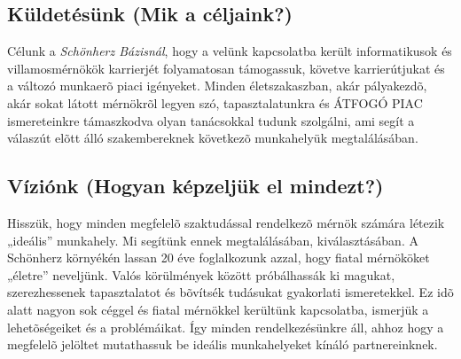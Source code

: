 \documentclass[12pt,a4paper]{report}	%
\begin{document}
\subsection{Küldetésünk (Mik a céljaink?)}
Célunk a \emph{Schönherz Bázisnál}, hogy a velünk kapcsolatba került informatikusok és villamosmérnökök karrierjét folyamatosan támogassuk, követve karrierútjukat és a változó munkaerõ piaci igényeket. Minden életszakaszban, akár pályakezdõ, akár sokat látott mérnökrõl legyen szó, tapasztalatunkra és \MakeUppercase{átfogó piac} ismereteinkre támaszkodva olyan tanácsokkal tudunk szolgálni, ami segít a válaszút elõtt álló szakembereknek következõ munkahelyük megtalálásában.
\nopagebreak
\subsection{Víziónk (Hogyan képzeljük el mindezt?)}
{\Huge Hisszük}, hogy minden megfelelõ szaktudással rendelkezõ mérnök számára létezik „ideális” munkahely. Mi segítünk ennek megtalálásában, kiválasztásában. A Schönherz környékén lassan 20 éve foglalkozunk azzal, hogy fiatal mérnököket „életre” neveljünk. Valós körülmények között próbálhassák ki magukat, sze\-rezhessenek tapasztalatot és bõvítsék tudásukat gyakorlati ismeretekkel. Ez idõ alatt nagyon sok céggel és fiatal mérnökkel kerültünk kapcsolatba, ismerjük a lehetõségeiket és a problémáikat. Így minden rendelkezésünkre áll, ahhoz hogy a megfelelõ jelöltet mutathassuk be ideális munkahelyeket kínáló partnereinknek.
\end{document}
